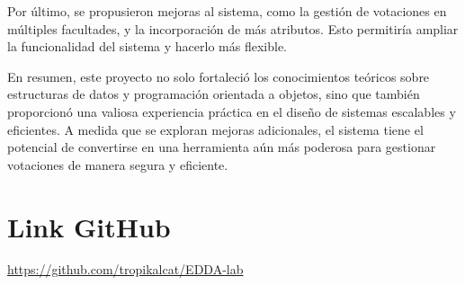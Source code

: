\documentclass[12pt]{article}
\begin{document}
Por último, se propusieron mejoras al sistema, como la gestión de votaciones en múltiples facultades, y la incorporación de más atributos. Esto permitiría ampliar la funcionalidad del sistema y hacerlo más flexible.

En resumen, este proyecto no solo fortaleció los conocimientos teóricos sobre estructuras de datos y programación orientada a objetos, sino que también proporcionó una valiosa experiencia práctica en el diseño de sistemas escalables y eficientes. A medida que se exploran mejoras adicionales, el sistema tiene el potencial de convertirse en una herramienta aún más poderosa para gestionar votaciones de manera segura y eficiente.

\section{Link GitHub}

\url{https://github.com/tropikalcat/EDDA-lab}
\end{document}
